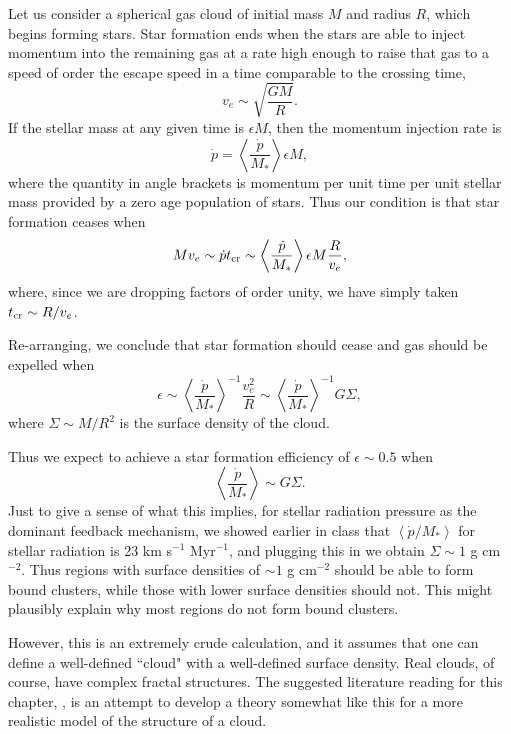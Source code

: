 Let us consider a spherical gas cloud of initial mass $M$ and radius $R$, which begins forming stars. Star formation ends when the stars are able to inject momentum into the remaining gas at a rate high enough to raise that gas to a speed of order the escape speed in a time comparable to the crossing time, 
\begin{equation}
v_e \sim \sqrt{\frac{G M}{R}}.
\end{equation}
If the stellar mass at any given time is $\epsilon M$, then the momentum injection rate is
\begin{equation}
\dot{p} = \left\langle\frac{\dot{p}}{M_*}\right\rangle \epsilon M,
\end{equation}
where the quantity in angle brackets is momentum per unit time per unit stellar mass provided by a zero age population of stars. Thus our condition is that star formation ceases when
\begin{equation}
M v_e \sim \dot{p} t_{\rm cr} \sim \left\langle\frac{\dot{p}}{M_*}\right\rangle \epsilon M \frac{R}{v_e},
\end{equation}
where, since we are dropping factors of order unity, we have simply taken $t_{\rm cr} \sim R/v_e$.

Re-arranging, we conclude that star formation should cease and gas should be expelled when
\begin{equation}
\epsilon \sim \left\langle\frac{\dot{p}}{M_*}\right\rangle^{-1} \frac{v_e^2}{R} \sim \left\langle\frac{\dot{p}}{M_*}\right\rangle^{-1} G\Sigma,
\end{equation}
where $\Sigma \sim M/R^2$ is the surface density of the cloud.

Thus we expect to achieve a star formation efficiency of $\epsilon \sim 0.5$ when
\begin{equation}
\left\langle\frac{\dot{p}}{M_*}\right\rangle\sim G \Sigma.
\end{equation}
Just to give a sense of what this implies, for stellar radiation pressure as the dominant feedback mechanism, we showed earlier in class that $\left\langle\dot{p}/M_*\right\rangle$ for stellar radiation is 23 km s$^{-1}$ Myr$^{-1}$, and plugging this in we obtain $\Sigma \sim 1$ g cm$^{-2}$. Thus regions with surface densities of $\sim 1$ g cm$^{-2}$ should be able to form bound clusters, while those with lower surface densities should not. This might plausibly explain why most regions do not form bound clusters.

However, this is an extremely crude calculation, and it assumes that one can define a well-defined ``cloud" with a well-defined surface density. Real clouds, of course, have complex fractal structures. The suggested literature reading for this chapter, \citet{kruijssen12a}, is an attempt to develop a theory somewhat like this for a more realistic model of the structure of a cloud.

